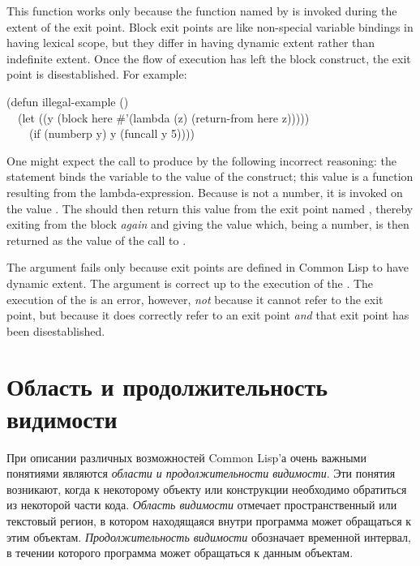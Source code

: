 This function  works only because the
function named by  is invoked during the extent of the exit point.
Block exit points are like non-special variable bindings in having
lexical scope, but they differ in having dynamic extent rather than indefinite
extent.  Once the flow of execution has left the block construct,
the exit point is disestablished.  For example:

\begin{lisp}
(defun illegal-example () \\
~~(let ((y (block here \#'(lambda (z) (return-from here z))))) \\
~~~~(if (numberp y) y (funcall y 5))))
\end{lisp}

One might expect the call  to produce 
by the following incorrect reasoning:
the  statement binds the variable  to the
value of the  construct; this value is a function resulting
from the lambda-expression.  Because  is not a number, it is
invoked on the value .  The  should then
return this value from the exit point named , thereby
exiting from the block \emph{again} and giving  the value 
which, being a number, is then returned as the value of the call
to .

The argument fails only because exit points are defined in Common Lisp
to have dynamic extent.  The argument is correct up to the execution
of the .  The execution of the  is
an error, however, \emph{not} because it cannot refer to the exit point,
but because it does correctly refer to an exit point \emph{and}
that exit point has been disestablished.

\else

\chapter{Область и продолжительность видимости}
\label{SCOPE}

При описании различных возможностей Common Lisp'а очень важными понятиями
являются \emph{области и продолжительности видимости}. Эти понятия возникают,
когда к некоторому объекту или конструкции необходимо обратиться из некоторой
части кода. \emph{Область видимости} отмечает пространственный или текстовый регион, в
котором находящаяся внутри программа может обращаться к этим
объектам. \emph{Продолжительность видимости} обозначает временной интервал, в течении
которого программа может обращаться к данным объектам.


